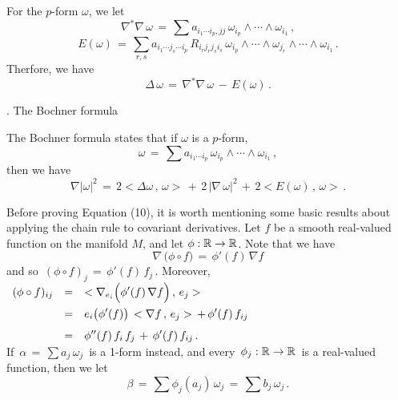 \documentclass{article}[12pt,a4paper]
\begin{document}
For the $p$-form $\omega$, we let
$$ \nabla^\ast \nabla \,\omega\,=\, \sum a_{i_1 \cdots i_p, jj}\,	\omega_{i_p} \wedge\cdots\wedge \omega_{i_1} \,, $$
\mbox{}
$$ E(\omega) \,=\, \sum_{r,s} a_{i_1\cdots j_s \cdots i_p}\, R_{i_r j_r j_s i_s} \,
	\omega_{i_p} \wedge\cdots\wedge  \omega_{j_r} \wedge\cdots\wedge \omega_{i_1}\,. $$
Therfore, we have
\begin{equation}
\Delta \,\omega \,=\, \nabla^\ast \nabla \,\omega \,-\, E(\omega)\,. 
\end{equation}
\vspace*{0.4in}

\begin{center} {. The Bochner formula}\end{center}
The Bochner formula states that if $\omega$ is a $p$-form,
$$ \omega \,=\, \sum a_{i_1 \cdots i_p}\,	\omega_{i_p} \wedge\cdots\wedge \omega_{i_1}\,,$$
then we have
\begin{equation}
	\nabla |\omega|^2 \,=\, 2<\Delta \omega\,,\,\omega> \,+\, 2\,|\nabla\,\omega|^2 \,+\, 
	2<E(\omega)\,,\,\omega>\,.
\end{equation}
\vspace*{4pt}

Before proving Equation (10), it is worth mentioning some basic results 
about applying the chain rule to covariant derivatives. Let $f$ be a smooth real-valued function
on the manifold $M$, and let $\phi: \mathbb{R} \to \mathbb{R}$. Note that we have
$$ \nabla\,\big(\phi \circ f\big) \,=\, \phi'(f)\,\nabla f$$
and so \,$ (\phi\circ f)_j \,=\, \phi'(f)\, f_j$\,. Moreover, \\

\newpage
$ \begin{array}{rcl}
(\phi \circ f)_{ij} &=& \displaystyle 
	<\nabla_{e_i}\Big(\phi'(f)\,\nabla f\Big)\,,\, e_j> \\[0.1in]
&=& \displaystyle
	e_i\big(\phi'(f)\big) \, <\nabla f\,,\, e_j> \,+\, \phi'(f)\,f_{ij} \\[0.1in]
&=& \displaystyle 
	\phi''(f)\,f_i\,f_j \,+\, \phi'(f) \, f_{ij}\,. \\
\end{array} $ \\[0.1in]

If \,$\alpha \,=\, \sum a_j \, \omega_j$\, is a 1-form instead, and every \,$\phi_j:\mathbb{R} \to \mathbb{R}$\,
is a real-valued function, then we let 
$$ \beta \,=\, \sum \phi_j(a_j)\, \omega_j \,=\, \sum b_j\,\omega_j\,.$$
\end{document}
